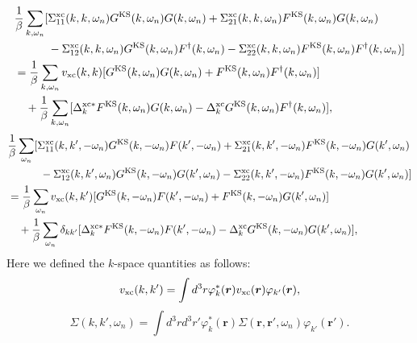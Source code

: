 \begin{equation}
	\begin{split}
	& \frac{1}{\beta} \sum_{k,\omega_n} [\Sigma^{\rm xc}_{11}(k,k,\omega_n)
	  G^{\rm KS}(k,\omega_n)G(k,\omega_n) + \Sigma^{\rm xc}_{21}(k,k,\omega_n)
	  F^{\rm KS}(k,\omega_n)G(k,\omega_n) \\
  	&\quad \quad \quad - \Sigma^{\rm xc}_{12}(k,k,\omega_n)G^{\rm KS}(k,\omega_n)F^{\dag}(k,\omega_n)
	- \Sigma^{\rm xc}_{22}(k,k,\omega_n)F^{\rm KS}(k,\omega_n)F^{\dag}(k,\omega_n)] \\
	& = \frac{1}{\beta}\sum_{k, \omega_n} v_{\rm xc}(k,k)
	[G^{\rm KS}(k,\omega_n)G(k,\omega_n) + F^{\rm KS}(k,\omega_n)F^{\dag}(k,\omega_n)] \\
	&\quad + \frac{1}{\beta} \sum_{k,\omega_n}[\Delta^{\rm xc\ast}_{k}
		F^{\rm KS}(k, \omega_n)G(k, \omega_n) - \Delta^{\rm xc}_{k}G^{\rm KS}(k,\omega_n)
	F^{\dag}(k,\omega_n)],
	\label{eq:11comp2}
\end{split}
\end{equation}
%
\begin{equation}
	\begin{split}
	& \frac{1}{\beta} \sum_{\omega_n} [\Sigma^{\rm xc}_{11}(k,k',-\omega_n)
	  G^{\rm KS}(k,-\omega_n)F(k',-\omega_n) + \Sigma^{\rm xc}_{21}(k,k',-\omega_n)
	  F^{\rm KS}(k,-\omega_n)G(k',\omega_n) \\
  	&\quad \quad \quad - \Sigma^{\rm xc}_{12}(k,k',\omega_n)G^{\rm KS}(k,-\omega_n)G(k',\omega_n)
	- \Sigma^{\rm xc}_{22}(k,k',-\omega_n)F^{\rm KS}(k,-\omega_n)G(k',\omega_n)] \\
	& = \frac{1}{\beta}\sum_{\omega_n} v_{\rm xc}(k,k')
	[G^{\rm KS}(k,-\omega_n)F(k',-\omega_n) + F^{\rm KS}(k,-\omega_n)G(k',\omega_n)] \\
	&\quad + \frac{1}{\beta} \sum_{\omega_n}\delta_{kk'}[\Delta^{\rm xc\ast}_{k}
		F^{\rm KS}(k, -\omega_n)F(k', -\omega_n) - \Delta^{\rm xc}_{k}G^{\rm KS}(k,-\omega_n)
	G(k',\omega_n)],
	\label{eq:12comp2}
\end{split}
\end{equation}
Here we defined the $k$-space quantities as follows:
%
\begin{equation}
	v_{\rm xc}(k,k') = \int d^3r \varphi^{\ast}_{k}(\bm r)v_{\rm xc}(\bm r)\varphi_{k'}(\bm r),
	\label{eq:vxckk}
\end{equation}
%
\begin{equation}
	\Sigma(k,k',\omega_n) = \int d^3r d^3r' \varphi^{\ast}_{k}(\bm r)
	\Sigma(\bm r,\bm r',\omega_n)\varphi_{k'}(\bm r').
	\label{eq:Sigmakk}
\end{equation}
